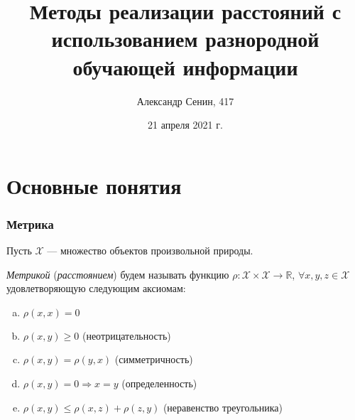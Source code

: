 \documentclass[9pt]{beamer}
\title[Short title]{Методы реализации расстояний с использованием разнородной обучающей информации} %
\author{Александр Сенин, 417} %
\date{21 апреля 2021 г.} %
\begin{document}
\begin{frame}
\titlepage %
\end{frame}



\section{Основные понятия} %



\begin{frame}
\frametitle{Метрика}
Пусть $\mathcal{X}$ --- множество объектов произвольной природы. 

\vspace{\baselineskip}
\textit{Метрикой} (\textit{расстоянием}) будем называть функцию $\rho: \mathcal{X} \times \mathcal{X} \to \mathbb{R}$, $\forall x, y, z \in \mathcal{X}$ удовлетворяющую следующим аксиомам:

\begin{enumerate}[(a)]
    \item $\rho(x, x) = 0$
	\item $\rho(x, y) \geqslant 0$ (неотрицательность)
	\item $\rho(x, y) = \rho(y, x)$ (симметричность)
	\item $\rho(x, y) = 0 \Longrightarrow x = y$ (определенность)
	\item $\rho(x, y) \leqslant \rho(x, z) + \rho(z, y)$ (неравенство треугольника)
\end{enumerate}
\end{frame}
\end{document}
